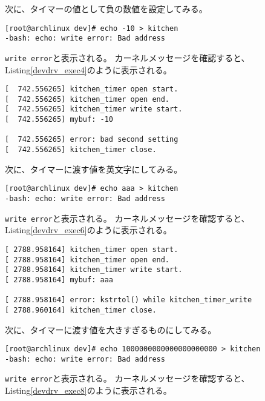 \documentclass[main]{subfiles}
\begin{document}
次に、タイマーの値として負の数値を設定してみる。

\begin{lstlisting}[label=devdrv_exec3,caption=タイマーに負の値を設定する]
[root@archlinux dev]# echo -10 > kitchen
-bash: echo: write error: Bad address
\end{lstlisting}

\texttt{write error}と表示される。
カーネルメッセージを確認すると、Listing\ref{devdrv_exec4}のように表示される。

\begin{lstlisting}[label=devdrv_exec4,caption=負の値を設定した時のカーネルメッセージ]
[  742.556265] kitchen_timer open start.
[  742.556265] kitchen_timer open end.
[  742.556265] kitchen_timer write start.
[  742.556265] mybuf: -10

[  742.556265] error: bad second setting
[  742.556265] kitchen_timer close.
\end{lstlisting}

次に、タイマーに渡す値を英文字にしてみる。

\begin{lstlisting}[label=devdrv_exec5,caption=タイマーに英文字を設定する]
[root@archlinux dev]# echo aaa > kitchen
-bash: echo: write error: Bad address
\end{lstlisting}

\texttt{write error}と表示される。
カーネルメッセージを確認すると、Listing\ref{devdrv_exec6}のように表示される。

\begin{lstlisting}[label=devdrv_exec6,caption=英文字を設定した時のカーネルメッセージ]
[ 2788.958164] kitchen_timer open start.
[ 2788.958164] kitchen_timer open end.
[ 2788.958164] kitchen_timer write start.
[ 2788.958164] mybuf: aaa

[ 2788.958164] error: kstrtol() while kitchen_timer_write
[ 2788.960164] kitchen_timer close.
\end{lstlisting}

次に、タイマーに渡す値を大きすぎるものにしてみる。

\begin{lstlisting}[label=devdrv_exec7,caption=タイマーに大きすぎる値を設定する]
[root@archlinux dev]# echo 1000000000000000000000 > kitchen
-bash: echo: write error: Bad address
\end{lstlisting}

\texttt{write error}と表示される。
カーネルメッセージを確認すると、Listing\ref{devdrv_exec8}のように表示される。
\end{document}
